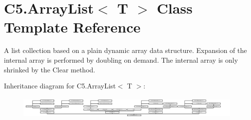 \hypertarget{class_c5_1_1_array_list}{}\section{C5.\+Array\+List$<$ T $>$ Class Template Reference}
\label{class_c5_1_1_array_list}


A list collection based on a plain dynamic array data structure. Expansion of the internal array is performed by doubling on demand. The internal array is only shrinked by the Clear method.  


Inheritance diagram for C5.\+Array\+List$<$ T $>$\+:\begin{figure}[H]
\begin{center}
\leavevmode
\includegraphics[height=1.126760cm]{class_c5_1_1_array_list}
\end{center}
\end{figure}
